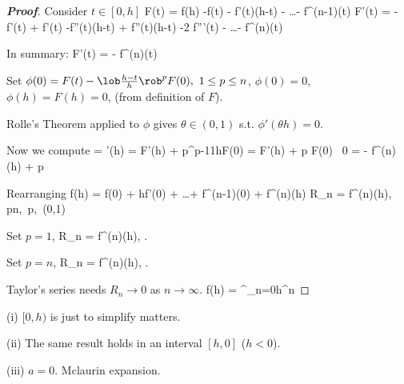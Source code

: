 \begin{proof}[{\bf Proof}]
Consider $t\in [0,h]$
\be
F(t) = f(h) -f(t) - f'(t)(h-t) - \dots -  f^{(n-1)}(t)
\ee
\be
F'(t) = -f'(t) + f'(t) -f''(t)(h-t) + f''(t)(h-t) -2 f'''(t) - \dots -  f^{(n)}(t)
\ee

In summary:
\be
F'(t) = -  f^{(n)}(t)
\ee

Set $\phi(0)=F(t) - \lob\frac{h-t}{h}\rob^p F(0), \ 1\leq p\leq n$, $\phi(0)=0$, $ \phi(h) = F(h) = 0$, (from definition of $F$). 

Rolle's Theorem applied to $\phi$ gives $\theta\in(0,1)$ s.t. $\phi'(\theta h)=0$. 

Now we compute 
 = \phi'(\theta h) = F'(\theta h) + p\lob{}\rob^{p-1}\lob\frac 1h\rob F(0) = F'(\theta h) + p F(0) 
\ee
\be
\ra \ 0 = -  f^{(n)}(\theta h) +  p  
\ee

Rearranging 
\be
f(h) = f(0) + hf'(0) + \dots +  f^{(n-1)}(0) + f^{(n)}(\theta h)
\ee
\be
R_n =  f^{(n)}(\theta h), \leq p\leq n,\ p\in \Z,\ \theta\in(0,1)
\ee

Set $p=1$,
\be
R_n =  f^{(n)}(\theta h), \quad {}.
\ee

Set $p=n$,
\be
R_n =  f^{(n)}(\theta h), \quad {}.
\ee

Taylor's series needs $R_n\to 0$ as $n\to \infty$.
\be
f(h) = \sum^\infty_{n=0}h^n
\ee
\end{proof}

\begin{remark}
\ben
\item [(i)] $[0,h)$ is just to simplify matters.
\item [(ii)] The same result holds in an interval $[h,0]$ ($h<0$).
\item [(iii)] $a=0$. Mclaurin expansion.
\een
\end{remark}

